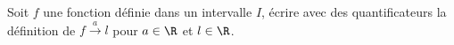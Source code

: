 Soit $f$ une fonction d\'efinie dans un intervalle $I$, \'ecrire avec des quantificateurs la d\'efinition de
$f\stackrel{a}{\rightarrow}l$ pour $a\in \R$ et $l\in \R$. \bigskip